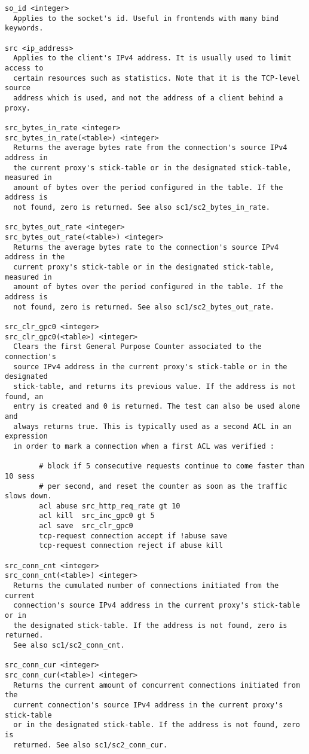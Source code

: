 \begin{verbatim}
so_id <integer>
  Applies to the socket's id. Useful in frontends with many bind keywords.

src <ip_address>
  Applies to the client's IPv4 address. It is usually used to limit access to
  certain resources such as statistics. Note that it is the TCP-level source
  address which is used, and not the address of a client behind a proxy.

src_bytes_in_rate <integer>
src_bytes_in_rate(<table>) <integer>
  Returns the average bytes rate from the connection's source IPv4 address in
  the current proxy's stick-table or in the designated stick-table, measured in
  amount of bytes over the period configured in the table. If the address is
  not found, zero is returned. See also sc1/sc2_bytes_in_rate.

src_bytes_out_rate <integer>
src_bytes_out_rate(<table>) <integer>
  Returns the average bytes rate to the connection's source IPv4 address in the
  current proxy's stick-table or in the designated stick-table, measured in
  amount of bytes over the period configured in the table. If the address is
  not found, zero is returned. See also sc1/sc2_bytes_out_rate.

src_clr_gpc0 <integer>
src_clr_gpc0(<table>) <integer>
  Clears the first General Purpose Counter associated to the connection's
  source IPv4 address in the current proxy's stick-table or in the designated
  stick-table, and returns its previous value. If the address is not found, an
  entry is created and 0 is returned. The test can also be used alone and
  always returns true. This is typically used as a second ACL in an expression
  in order to mark a connection when a first ACL was verified :

        # block if 5 consecutive requests continue to come faster than 10 sess
        # per second, and reset the counter as soon as the traffic slows down.
        acl abuse src_http_req_rate gt 10
        acl kill  src_inc_gpc0 gt 5
        acl save  src_clr_gpc0
        tcp-request connection accept if !abuse save
        tcp-request connection reject if abuse kill

src_conn_cnt <integer>
src_conn_cnt(<table>) <integer>
  Returns the cumulated number of connections initiated from the current
  connection's source IPv4 address in the current proxy's stick-table or in
  the designated stick-table. If the address is not found, zero is returned.
  See also sc1/sc2_conn_cnt.

src_conn_cur <integer>
src_conn_cur(<table>) <integer>
  Returns the current amount of concurrent connections initiated from the
  current connection's source IPv4 address in the current proxy's stick-table
  or in the designated stick-table. If the address is not found, zero is
  returned. See also sc1/sc2_conn_cur.


\end{verbatim}
